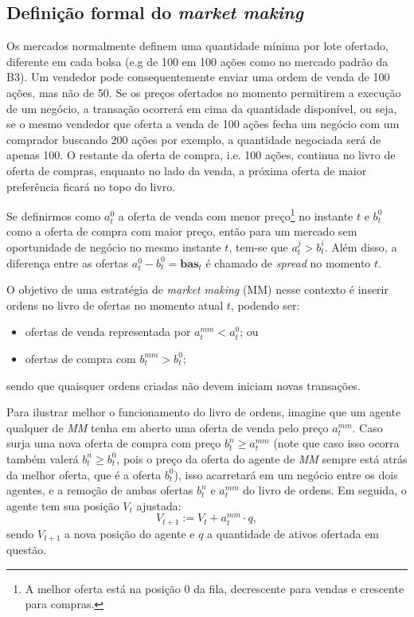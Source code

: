 \subsection{Definição formal do \textit{market making}}

Os mercados normalmente definem uma quantidade mínima por lote ofertado, diferente em cada bolsa (e.g de 100 em 100 ações como no mercado padrão da B3). Um vendedor pode consequentemente enviar uma ordem de venda de 100 ações, mas não de 50. Se os preços ofertados no momento permitirem a execução de um negócio, a transação ocorrerá em cima da quantidade disponível, ou seja, se o mesmo vendedor que oferta a venda de 100 ações fecha um negócio com um comprador buscando 200 ações por exemplo, a quantidade negociada será de apenas 100. O restante da oferta de compra, i.e. 100 ações, continua no livro de oferta de compras, enquanto no lado da venda, a próxima oferta de maior preferência ficará no topo do livro. 

Se definirmos como $a^{0}_{t}$ a oferta de venda com menor preço\footnote{A melhor oferta está na posição 0 da fila, decrescente para vendas e crescente para compras.} no instante $t$ e $b^{0}_{t}$ como a oferta de compra com maior preço, então para um mercado sem oportunidade de negócio no mesmo instante $t$, tem-se que $a^{j}_{t} > b^{i}_{t}$. Além disso, a diferença entre as ofertas $a^{0}_{t} - b^{0}_{t} = \mathbf{bas}_t$ é chamado de \textit{spread} no momento $t$.

O objetivo de uma estratégia de \textit{market making} (MM) nesse contexto é inserir ordens no livro de ofertas no momento atual $t$, podendo ser: 

\begin{itemize}
    \item ofertas de venda representada por $a^{mm}_{t} < a^{0}_{t}$; ou 
    \item ofertas de compra com $b^{mm}_{t} > b^{0}_{t}$;
\end{itemize}
sendo que quaisquer ordens criadas não devem iniciam novas transações.

Para ilustrar melhor o funcionamento do livro de ordens, imagine que um agente qualquer de \textit{MM} tenha em aberto uma oferta de venda pelo preço $a^{mm}_{t}$. Caso surja uma nova oferta de compra com preço $b^{n}_{t} \geq a^{mm}_{t}$ (note que caso isso ocorra também valerá $b^{n}_{t} \geq b^{0}_{t}$, pois o preço da oferta do agente de \textit{MM} sempre está atrás da melhor oferta, que é a oferta $b_{t}^{0}$), isso acarretará em um negócio entre os dois agentes, e a remoção de ambas ofertas $b_{t}^{n} \text{ e } a_{t}^{mm}$ do livro de ordens. Em seguida, o agente tem sua posição $V_{t}$ ajustada:
\begin{equation}
    V_{t + 1}:= V_{t} + a^{mm}_{t}\cdot q,
\end{equation}
sendo $V_{t + 1}$ a nova posição do agente e $q$ a quantidade de ativos ofertada em questão.

